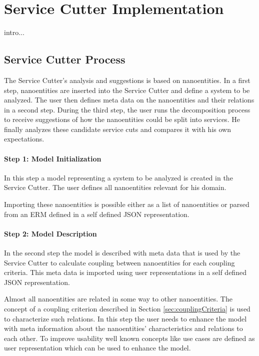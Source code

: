 
\chapter{Service Cutter Implementation}
\label{cha:implementation}

intro... %


\section{Service Cutter Process}

The Service Cutter's analysis and suggestions is based on nanoentities. In a first step, nanoentities are inserted into the Service Cutter and define a system to be analyzed. The user then defines meta data on the nanoentities and their relations in a second step. During the third step, the user runs the decomposition process to receive suggestions of how the nanoentities could be split into services. He finally analyzes these candidate service cuts and compares it with his own expectations. 

\subsubsection{Step 1: Model Initialization}

In this step a model representing a system to be analyzed is created in the Service Cutter. The user defines all nanoentities relevant for his domain. 

Importing these nanoentities is possible either as a list of nanoentities or parsed from an \gls{ERM} defined in a self defined JSON representation.


\subsubsection{Step 2: Model Description}

In the second step the model is described with meta data that is used by the Service Cutter to calculate coupling between nanoentities for each coupling criteria. This meta data is imported using user representations in a self defined JSON representation.


Almost all nanoentities are related in some way to other nanoentities. The concept of a coupling criterion described in Section \ref{sec:couplingCriteria} is used to characterize such relations. In this step the user needs to enhance the model with meta information about the nanoentities' characteristics and relations to each other. To improve usability well known concepts like use cases are defined as user representation which can be used to enhance the model. 


